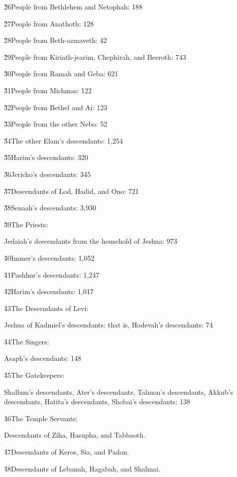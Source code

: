 \v{26}People from Bethlehem and Netophah: 188

\v{27}People from Anathoth: 128

\v{28}People from Beth-azmaveth: 42

\v{29}People from Kiriath-jearim, Chephirah, and Beeroth: 743

\v{30}People from Ramah and Geba: 621

\v{31}People from Michmas: 122

\v{32}People from Bethel and Ai: 123

\v{33}People from the other Nebo: 52

\v{34}The other Elam's descendants: 1,254

\v{35}Harim's descendants: 320

\v{36}Jericho's descendants: 345

\v{37}Descendants of Lod, Hadid, and Ono: 721

\v{38}Senaah's descendants: 3,930

\v{39}The Priests:

Jedaiah's descendants from the household of Jeshua: 973

\v{40}Immer's descendants: 1,052

\v{41}Pashhur's descendants: 1,247

\v{42}Harim's descendants: 1,017

\v{43}The Descendants of Levi:

Jeshua of Kadmiel's descendants: that is, Hodevah's descendants: 74

\v{44}The Singers:

Asaph's descendants: 148

\v{45}The Gatekeepers:

Shallum's descendants, Ater's descendants, Talmon's descendants, Akkub's descendants, Hatita's descendants, Shobai's descendants: 138

\v{46}The Temple Servants:

Descendants of Ziha, Hasupha, and Tabbaoth.

\v{47}Descendants of Keros, Sia, and Padon.

\v{48}Descendants of Lebanah, Hagabah, and Shalmai.

